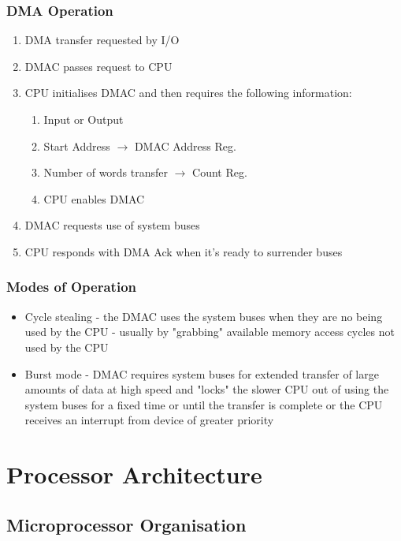 \documentclass[a4paper]{article}
\theoremstyle{plain}
\theoremstyle{definition}
\theoremstyle{remark}
\begin{document}
\subsubsection{DMA Operation}
\begin{enumerate}
	\item DMA transfer requested by I/O
	\item DMAC passes request to CPU
	\item CPU initialises DMAC and then requires the following information:
		\begin{enumerate}
			\item Input or Output
			\item Start Address $\to $ DMAC Address Reg.
			\item Number of words transfer $\to $ Count Reg.
			\item CPU enables DMAC
		\end{enumerate}
	\item DMAC requests use of system buses
	\item CPU responds with DMA Ack when it's ready to surrender buses
\end{enumerate}
\subsubsection{Modes of Operation}
\begin{itemize}
	\item Cycle stealing - the DMAC uses the system buses when they are no being used by the CPU - usually by "grabbing" available memory access cycles not used by the CPU
	\item Burst mode - DMAC requires system buses for extended transfer of large amounts of data at high speed and "locks" the slower CPU out of using the system buses for a fixed time or until the transfer is complete or the CPU receives an interrupt from device of greater priority
\end{itemize}
\section{Processor Architecture}
\subsection{Microprocessor Organisation}
\end{document}
